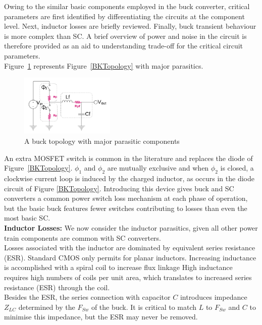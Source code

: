 \documentclass[letterpaper,twocolumn,10pt]{article}
\begin{document}
Owing to the similar basic components employed in the buck converter, critical parameters are first identified by differentiating the circuits at the component level. Next, inductor losses are briefly reviewed. Finally, buck transient behaviour is more complex than SC. A brief overview of power and noise in the circuit is therefore provided as an aid to understanding trade-off for the critical circuit parameters.\\
Figure~\ref{NonIdealBuckTopology} represents Figure~\ref{BKTopology} with major parasitics.\\
\begin{figure}[here]
\includegraphics[width=0.4\textwidth]{BuckTopologyParasitics}
\caption{A buck topology with major parasitic components}
\label{NonIdealBuckTopology}
\end{figure}
An extra MOSFET switch is common in the literature and replaces the diode of Figure~\ref{BKTopology}. $\phi_1$ and $\phi_2$ are mutually exclusive and when $\phi_2$ is closed, a clockwise current loop is induced by the charged inductor, as occurs in the diode circuit of Figure \ref{BKTopology}. Introducing this device gives buck and SC converters a common power switch loss mechanism at each phase of operation, but the basic buck features fewer switches contributing to losses than even the most basic SC.\\
\textbf{Inductor Losses: }We now consider the inductor parasitics, given all other power train components are common with SC converters.\\
Losses associated with the inductor are dominated by equivalent series resistance (ESR). Standard CMOS only permits for planar inductors. Increasing inductance is accomplished with a spiral coil to increase flux linkage High inductance requires high numbers of coils per unit area, which translates to increased series resistance (ESR) through the coil.\\
Besides the ESR, the series connection with capacitor $C$ introduces impedance $Z_{LC}$ determined by the $F_{Sw}$ of the buck. It is critical to match $L$ to $F_{Sw}$ and $C$ to minimise this impedance, but the ESR may never be removed.\\  
\end{document}
